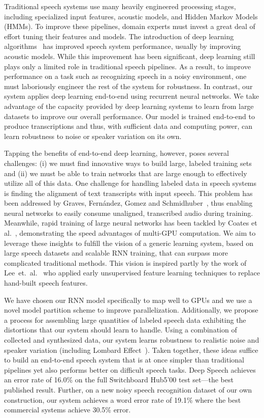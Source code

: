 \documentclass{article}
\begin{document}
Traditional speech systems use many heavily engineered processing stages,
including specialized input features, acoustic models, and Hidden Markov Models
(HMMs).  To improve these pipelines, domain experts must invest a great deal of
effort tuning their features and models.  The introduction of deep learning
algorithms~\cite{lee2009cdbn_audio,Mohamed2011,grosse2012shift,Hinton2012,Dahl2011a}
has improved speech system performance, usually by improving acoustic models.
While this improvement has  been significant, deep learning still plays only a
limited role in traditional speech pipelines.  As a result, to improve
performance on a task such as recognizing speech in a noisy environment, one
must laboriously engineer the rest of the system for robustness.  In contrast,
our system applies deep learning end-to-end using recurrent neural networks.
We take advantage of the capacity provided by deep learning systems to learn
from large datasets to improve our overall performance.  Our model is trained
end-to-end to produce transcriptions and thus, with sufficient data and
computing power, can learn robustness to noise or speaker variation on its own.

Tapping the benefits of end-to-end deep learning, however, poses several
challenges:  (i) we must find innovative ways to build large, labeled training
sets and (ii) we must be able to train networks that are large enough to
effectively utilize all of this data.  One challenge for handling labeled data
in speech systems is finding the alignment of text transcripts with input
speech.  This problem has been addressed by Graves, Fern\'{a}ndez, Gomez and
Schmidhuber~\cite{Graves2006}, thus enabling neural networks to easily consume
unaligned, transcribed audio during training.  Meanwhile, rapid training of
large neural networks has been tackled by Coates et
al.~\cite{coates2013cotshpc}, demonstrating the speed advantages of multi-GPU
computation.  We aim to leverage these insights to fulfill the vision of a
generic learning system, based on large speech datasets and scalable RNN
training, that can surpass more complicated traditional methods.  This vision
is inspired partly by the work of Lee~et.~al.~\cite{lee2009cdbn_audio} who
applied early unsupervised feature learning techniques to replace hand-built
speech features.

We have chosen our RNN model specifically to map well to GPUs and we use a
novel model partition scheme to improve parallelization.  Additionally, we
propose a process for assembling large quantities of labeled speech data
exhibiting the distortions that our system should learn to handle.  Using a
combination of collected and synthesized data, our system learns robustness to
realistic noise and speaker variation (including Lombard
Effect~\cite{junqua1993lombard}).  Taken together, these ideas suffice to build
an end-to-end speech system that is at once simpler than traditional pipelines
yet also performs better on difficult speech tasks.  Deep Speech achieves an
error rate of 16.0\% on the full Switchboard Hub5'00 test set---the best
published result.  Further, on a new noisy speech recognition dataset of our
own construction, our system achieves a word error rate of 19.1\% where the
best commercial systems achieve 30.5\% error.
\end{document}
